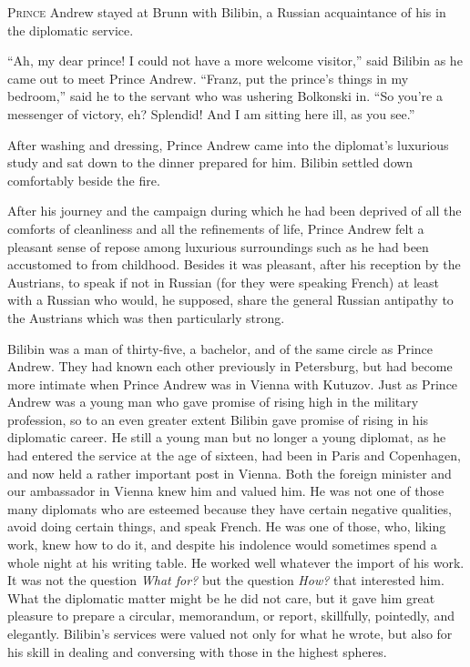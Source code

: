 \lettrine[lines=2, loversize=0.3, lraise=0]{\initfamily P}{rince}
Andrew stayed at Brunn with Bilibin, a Russian
acquaintance of his in the diplomatic service.

``Ah, my dear prince! I could not have a more welcome visitor,''
said Bilibin as he came out to meet Prince Andrew. ``Franz, put
the prince's things in my bedroom,'' said he to the servant who
was ushering Bolkonski in. ``So you're a messenger of victory,
eh? Splendid! And I am sitting here ill, as you see.''

After washing and dressing, Prince Andrew came into the
diplomat's luxurious study and sat down to the dinner prepared
for him. Bilibin settled down comfortably beside the fire.

After his journey and the campaign during which he had been
deprived of all the comforts of cleanliness and all the
refinements of life, Prince Andrew felt a pleasant sense of
repose among luxurious surroundings such as he had been
accustomed to from childhood. Besides it was pleasant, after his
reception by the Austrians, to speak if not in Russian (for they
were speaking French) at least with a Russian who would, he
supposed, share the general Russian antipathy to the Austrians
which was then particularly strong.

Bilibin was a man of thirty-five, a bachelor, and of the same
circle as Prince Andrew. They had known each other previously in
Petersburg, but had become more intimate when Prince Andrew was
in Vienna with Kutuzov.  Just as Prince Andrew was a young man
who gave promise of rising high in the military profession, so to
an even greater extent Bilibin gave promise of rising in his
diplomatic career. He still a young man but no longer a young
diplomat, as he had entered the service at the age of sixteen,
had been in Paris and Copenhagen, and now held a rather important
post in Vienna. Both the foreign minister and our ambassador in
Vienna knew him and valued him. He was not one of those many
diplomats who are esteemed because they have certain negative
qualities, avoid doing certain things, and speak French. He was
one of those, who, liking work, knew how to do it, and despite
his indolence would sometimes spend a whole night at his writing
table. He worked well whatever the import of his work. It was not
the question \emph{What for?} but the question \emph{How?} that
interested him. What the diplomatic matter might be he did not
care, but it gave him great pleasure to prepare a circular,
memorandum, or report, skillfully, pointedly, and elegantly.
Bilibin's services were valued not only for what he wrote, but
also for his skill in dealing and conversing with those in the
highest spheres.

